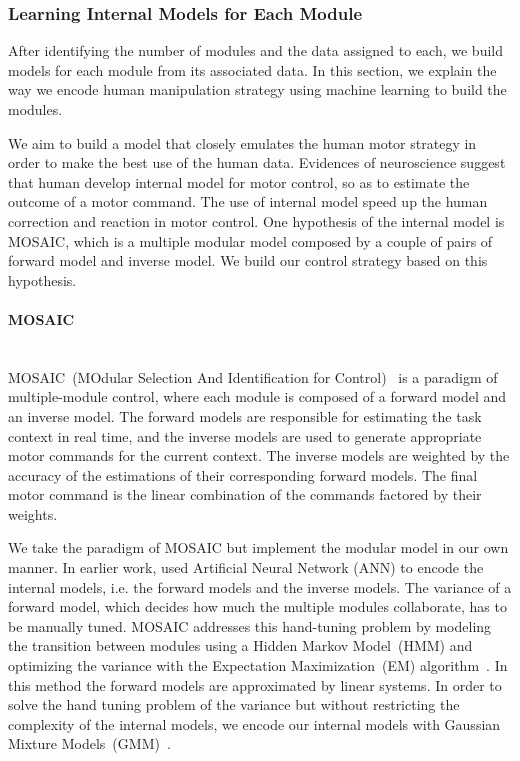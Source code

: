 \subsubsection{Learning Internal Models for Each Module}
\label{cha4:sec2:learn:model}

After identifying the number of modules and the data assigned to each, we build models for each module from its associated data. In this section, we explain the way we encode human manipulation strategy using machine learning to build the modules.

We aim to build a model that closely emulates the human motor strategy
in order to make the best use of the human data. Evidences of neuroscience suggest that human develop internal model for motor control, so as to estimate the outcome of a motor command. The use of internal model speed up the human correction and reaction in motor control. One hypothesis of the internal model is MOSAIC, which is a multiple modular model composed by a couple of pairs of forward model and inverse model. We build our control strategy based on this hypothesis.

\paragraph{MOSAIC} ~\\
MOSAIC~(MOdular Selection And
Identification for Control)~\citep{haruno2001mosaic} is a paradigm of multiple-module control,
where each module is composed of a forward model and an inverse
model. The forward models are responsible for estimating the task
context in real time, and the inverse models are used to generate
appropriate motor commands for the current context. The inverse models
are weighted by the accuracy of the estimations of their corresponding
forward models. The final motor command is the linear combination of
the commands factored by their weights.

We take the paradigm of MOSAIC but implement the modular model in our own manner. In earlier work, \citet{wolpert1998multiple} used
Artificial Neural Network (ANN) to encode the internal models,
i.e. the forward models and the inverse models. The variance of a
forward model, which decides how much the multiple modules
collaborate, has to be manually tuned. MOSAIC addresses this
hand-tuning problem by modeling the transition between modules using a Hidden Markov Model~(HMM) and optimizing the variance with the
Expectation Maximization~(EM) algorithm~\citep{haruno2001mosaic}. In
this method the forward models are approximated by linear systems. In order to solve the hand tuning problem of the variance but without restricting the complexity of the internal models, we encode our internal models with
Gaussian Mixture Models~(GMM)~\citep{cohn1996active}.

